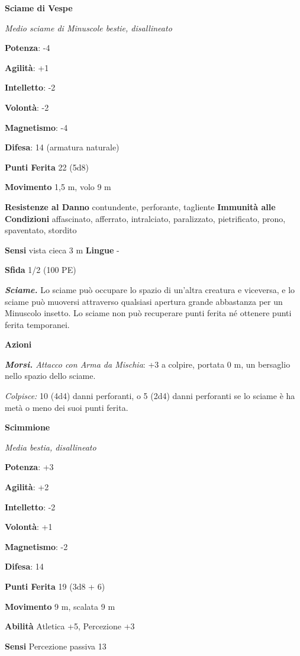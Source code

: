 \begin{multicols}{2}
\textbf{Sciame di Vespe}

\emph{Medio sciame di Minuscole bestie, disallineato}

\textbf{Potenza}: -4

\textbf{Agilità}: +1

\textbf{Intelletto}: -2

\textbf{Volontà}: -2

\textbf{Magnetismo}: -4

\textbf{Difesa}: 14 (armatura naturale)

\textbf{Punti Ferita} 22 (5d8)

\textbf{Movimento} 1,5 m, volo 9 m

\textbf{Resistenze al Danno} contundente, perforante, tagliente
\textbf{Immunità alle Condizioni} affascinato, afferrato, intralciato,
paralizzato, pietrificato, prono, spaventato, stordito

\textbf{Sensi} vista cieca 3 m \textbf{Lingue} -

\textbf{Sfida} 1/2 (100 PE)

\emph{\textbf{Sciame.}} Lo sciame può occupare lo spazio di un'altra
creatura e viceversa, e lo sciame può muoversi attraverso qualsiasi
apertura grande abbastanza per un Minuscolo insetto. Lo sciame non può
recuperare punti ferita né ottenere punti ferita temporanei.

\textbf{Azioni}

\emph{\textbf{Morsi.} Attacco con Arma da Mischia}: +3 a colpire,
portata 0 m, un bersaglio nello spazio dello sciame.

\emph{Colpisce:} 10 (4d4) danni perforanti, o 5 (2d4) danni perforanti
se lo sciame è ha metà o meno dei suoi punti ferita.

\textbf{Scimmione}

\emph{Media bestia, disallineato}

\textbf{Potenza}: +3

\textbf{Agilità}: +2

\textbf{Intelletto}: -2

\textbf{Volontà}: +1

\textbf{Magnetismo}: -2

\textbf{Difesa}: 14

\textbf{Punti Ferita} 19 (3d8 + 6)

\textbf{Movimento} 9 m, scalata 9 m

\textbf{Abilità} Atletica +5, Percezione +3

\textbf{Sensi} Percezione passiva 13


\end{multicols}
